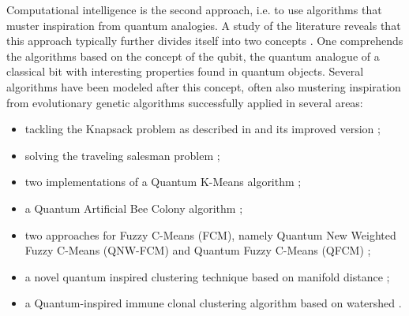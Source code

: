 Computational intelligence is the second approach, i.e. to use algorithms that muster inspiration from quantum analogies.
A study of the literature reveals that this approach typically further divides itself into two concepts \cite{Casper2013}.
One comprehends the algorithms based on the concept of the qubit, the quantum analogue of a classical bit with interesting properties found in quantum objects.
Several algorithms have been modeled after this concept, often also mustering inspiration from evolutionary genetic algorithms successfully applied in several areas:
\begin{itemize}
	\item tackling the Knapsack problem as described in \cite{Han2000} and its improved version \cite{Liu2010};

	\item solving the traveling salesman problem \cite{Talbi2004};

    \item two implementations of a Quantum K-Means algorithm \cite{Casper2012KMeans,Xiao2010};

    \item a Quantum Artificial Bee Colony algorithm \cite{hung2013quantum,Casper2013};

    \item two approaches for Fuzzy C-Means (FCM), namely Quantum New Weighted Fuzzy C-Means (QNW-FCM) \cite{Casper2013} and Quantum Fuzzy C-Means (QFCM) \cite{hung2013quantumcmeans,Casper2013};

    \item a novel quantum inspired clustering technique based on manifold distance \cite{Liang2009};

    \item a Quantum-inspired immune clonal clustering algorithm based on watershed \cite{Li2010}.
\end{itemize}

